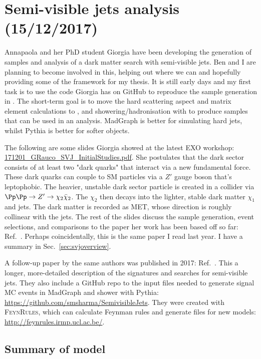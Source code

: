 
\chapter{Semi-visible jets analysis (15/12/2017)}

Annapaola and her PhD student Giorgia have been developing the generation of samples and analysis of a dark matter search with semi-visible jets. Ben and I are planning to become involved in this, helping out where we can and hopefully providing some of the framework for my thesis. It is still early days and my first task is to use the code Giorgia has on GitHub to reproduce the sample generation in \PYTHIA. The short-term goal is to move the hard scattering aspect and matrix element calculations to \madgraph, and showering/hadronisation with \PYTHIA to produce samples that can be used in an analysis. MadGraph is better for simulating hard jets, whilst Pythia is better for softer objects.

The following are some slides Giorgia showed at the latest EXO workshop: \href{run:sec35/171201_GRauco_SVJ_InitialStudies.pdf}{171201\_GRauco\_SVJ\_InitialStudies.pdf}. She postulates that the dark sector consists of at least two "dark quarks" that interact via a new fundamental force. These dark quarks can couple to SM particles via a $Z'$ gauge boson that's leptophobic. The heavier, unstable dark sector particle is created in a collider via $\Pp\Pp \rightarrow Z' \rightarrow \chi_2 \bar{\chi}_2$. The $\chi_2$ then decays into the lighter, stable dark matter $\chi_1$ and jets. The dark matter is recorded as MET, whose direction is roughly collinear with the jets. The rest of the slides discuss the sample generation, event selections, and comparisons to the paper her work has been based off so far: Ref.~\cite{Cohen:2015toa}. Perhaps coincidentally, this is the same paper I read last year. I have a summary in Sec.~\ref{sec:svjoverview}.

A follow-up paper by the same authors was published in 2017: Ref.~\cite{Cohen:2017pzm}. This a longer, more-detailed description of the signatures and searches for semi-visible jets. They also include a GitHub repo to the input files needed to generate signal MC events in MadGraph and shower with Pythia: \url{https://github.com/smsharma/SemivisibleJets}. They were created with \textsc{FeynRules}, which can calculate Feynman rules and generate files for new models: \url{http://feynrules.irmp.ucl.ac.be/}.


\section{Summary of model}


